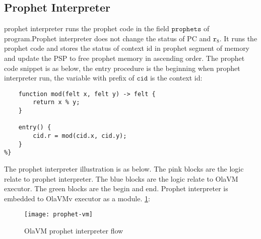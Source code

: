 \subsection{Prophet Interpreter}\label{subsec: prophet-interpreter}
prophet interpreter runs the prophet code in the field $\texttt{prophets}$ of program.Prophet interpreter does not change the status of PC and $\texttt{r}_{8}$.
It runs the prophet code and stores the status of context id in prophet segment of memory and update the PSP to free prophet memory in ascending order.
The prophet code snippet is as below, the entry procedure is the beginning when prophet interpreter run, the variable with prefix of $\texttt{cid}$ is the context id:
\begin{lstlisting}[label={lst:prophet-demo}]
%{
    function mod(felt x, felt y) -> felt {
        return x % y;
    }

    entry() {
        cid.r = mod(cid.x, cid.y);
    }
%}
\end{lstlisting}

The prophet interpreter illustration is as below.
The pink blocks are the logic relate to prophet interpreter.
The blue blocks are the logic relate to OlaVM executor.
The green blocks are the begin and end.
Prophet interpreter is embedded to OlaVMv executor as a module. \ref{fig: prophet-interpreter-logic}:
\begin{figure}[!htp]
    \centering
    \texttt{[image: prophet-vm]}
    \caption{OlaVM prophet interpreter flow}
    \label{fig: prophet-interpreter-logic}
\end{figure}
